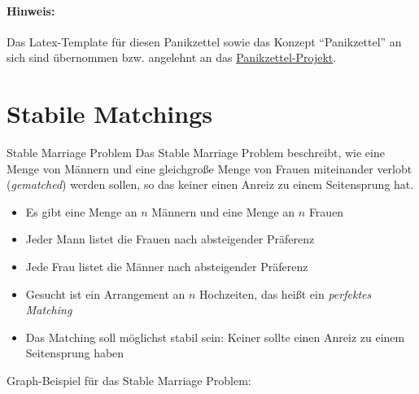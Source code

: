 \documentclass{panikzettel}
\begin{document}
\vspace{-0.5\baselineskip}
{\small{}
	\paragraph{Hinweis:}
	Das Latex-Template für diesen Panikzettel sowie das Konzept ``Panikzettel'' an sich sind übernommen bzw. angelehnt an das \href{https://git.rwth-aachen.de/philipp.schroer/panikzettel}{Panikzettel-Projekt}.

\section{Stabile Matchings}

\begin{halfboxl}
	\vspace{-\baselineskip}
	\begin{defi}{Stable Marriage Problem}
	Das Stable Marriage Problem beschreibt, wie eine Menge von Männern und eine gleichgroße Menge von Frauen miteinander verlobt (\emph{gematched}) werden sollen, so das keiner einen Anreiz zu einem Seitensprung hat.\\
	
	\begin{itemize}
		\item Es gibt eine Menge an $n$ Männern und eine Menge an $n$ Frauen
		\item Jeder Mann listet die Frauen nach absteigender Präferenz
		\item Jede Frau listet die Männer nach absteigender Präferenz
		\item Gesucht ist ein Arrangement an $n$ Hochzeiten, das heißt ein \emph{perfektes Matching}
		\item Das Matching soll möglichst stabil sein: Keiner sollte einen Anreiz zu einem Seitensprung haben
	\end{itemize}
	\end{defi}
\end{halfboxl}%
\begin{halfboxr}
	 \vspace{-\baselineskip}
	Graph-Beispiel für das Stable Marriage Problem:\\
	
	\begin{center}
\end{center}
\end{halfboxr}}
\end{document}

